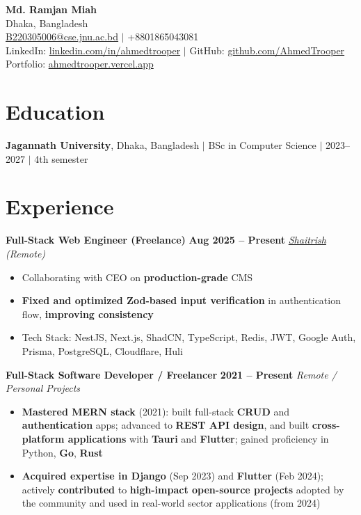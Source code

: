 \documentclass[10pt,a4paper]{article}
\begin{document}
\begin{center}
    {\LARGE \textbf{Md. Ramjan Miah}} \\[3pt]
    Dhaka, Bangladesh \\[2pt]
    \href{mailto:B220305006@cse.jnu.ac.bd}{B220305006@cse.jnu.ac.bd} $|$ +8801865043081 \\[2pt]
    LinkedIn: \href{https://linkedin.com/in/ahmedtrooper}{linkedin.com/in/ahmedtrooper} $|$ 
    GitHub: \href{https://github.com/AhmedTrooper}{github.com/AhmedTrooper} \\[2pt]
    Portfolio: \href{https://ahmedtrooper.vercel.app}{ahmedtrooper.vercel.app}
\end{center}

\vspace{-4pt}

\section{Education}
	\textbf{Jagannath University}, Dhaka, Bangladesh $|$ BSc in Computer Science $|$ 2023--2027 $|$  4th semester 
\section{Experience}
	\textbf{Full-Stack Web Engineer (Freelance)} \hfill \textbf{Aug 2025 -- Present} 
	\textit{\href{https://www.shaitrish.com/}{Shaitrish} (Remote)} \\[-6pt]
\begin{itemize}[leftmargin=12pt, itemsep=0pt, topsep=2pt]
    \item Collaborating with CEO on \textbf{production-grade} CMS
    \item \textbf{Fixed and optimized Zod-based input verification} in authentication flow, \textbf{improving consistency}
    \item Tech Stack: NestJS, Next.js, ShadCN, TypeScript, Redis, JWT, Google Auth, Prisma, PostgreSQL, Cloudflare, Huli
\end{itemize}

\textbf{Full-Stack Software Developer / Freelancer} \hfill \textbf{2021 -- Present} 
	\textit{Remote / Personal Projects} \\[-6pt]
\begin{itemize}[leftmargin=12pt, itemsep=0pt, topsep=2pt]
    \item \textbf{Mastered MERN stack} (2021): built full-stack \textbf{CRUD} and \textbf{authentication} apps; advanced to \textbf{REST API design}, and built \textbf{cross-platform applications} with \textbf{Tauri} and \textbf{Flutter}; gained proficiency in Python, \textbf{Go}, \textbf{Rust}
    \item \textbf{Acquired expertise in Django} (Sep 2023) and \textbf{Flutter} (Feb 2024); actively \textbf{contributed} to \textbf{high-impact open-source projects} adopted by the community and used in real-world sector applications (from 2024)
\end{itemize}
\end{document}

